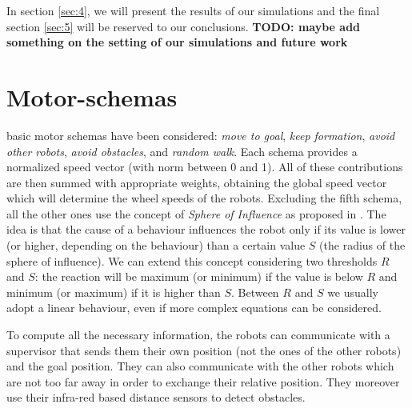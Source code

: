 \documentclass[journal]{IEEEtran}
\begin{document}
In section \ref{sec:4}, we will present the results of our
simulations and the final section \ref{sec:5} will be reserved to our conclusions. 
\textbf{TODO: maybe add something on the setting of our simulations and future work}

\section{Motor-schemas}
\label{sec:2}
 basic motor schemas have been considered: \textit{move to goal}, \textit{keep formation}, \textit{avoid other robots}, \textit{avoid obstacles}, and \textit{random walk}. %
Each schema provides a normalized speed vector (with norm between
0 and 1). All of these contributions are then summed with appropriate weights, obtaining the
global speed vector which will determine the wheel speeds of the robots. 
Excluding the fifth schema, all the other ones use the concept of
\textit{Sphere of Influence} as proposed in
\cite{IEEEhowto:arkin_motor_schemas}. The idea is that the cause of a
behaviour influences the robot only if its value is lower (or higher, depending on the behaviour) than a certain value $S$ (the radius of the sphere of influence). We can extend this concept considering two thresholds $R$ and $S$: the reaction will be maximum (or minimum) if the value is below $R$ and minimum (or maximum) if it is higher than $S$. Between $R$ and $S$ we usually adopt a linear behaviour, even if more complex equations can be considered.

To compute all the necessary information, the robots can communicate with a supervisor that sends them their own position (not the ones of the other robots) and the goal position. They can also communicate with the other robots which are not too far away in order to exchange their relative position. They moreover use their infra-red based distance sensors to detect obstacles.
\end{document}
